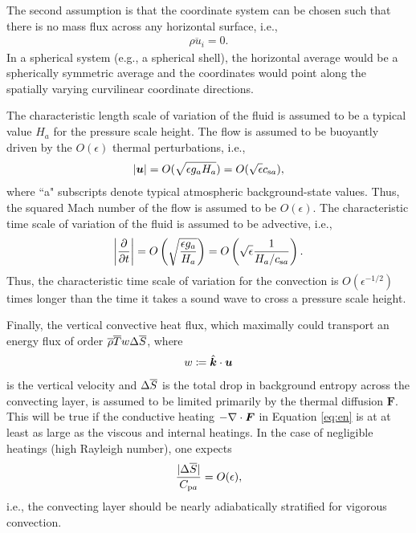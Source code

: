 \documentclass[12pt]{article}
\newcommand{\vecf}{\bm{F}}
\newcommand{\veck}{\hat{\bm{k}}}
\newcommand{\csa}{c_{{\rm s}a}}
\newcommand{\cpa}{C_{{\rm p}a}}
\begin{document}
	The second assumption is that the coordinate system can be chosen such that there is no mass flux across any horizontal surface, i.e.,
	\begin{align}\label{eq:nomassflux}
		\overline{\rho u_i}=0.
	\end{align}
	In a spherical system (e.g., a spherical shell), the horizontal average would be a spherically symmetric average and the coordinates would point along the spatially varying curvilinear coordinate directions. 
	
	The characteristic length scale of variation of the fluid is assumed to be a typical value $H_a$ for the pressure scale height. The flow is assumed to be buoyantly driven by the $O(\epsilon)$ thermal perturbations, i.e., 
	\begin{align}\label{eq:scaleu}
		|\vecu| = O(\sqrt{\epsilon g_a H_a}) = O(\sqrt{\epsilon}\csa),
	\end{align}
	where ``a" subscripts denote typical atmospheric background-state values. Thus, the squared Mach number of the flow is assumed to be $O(\epsilon)$. The characteristic time scale of variation of the fluid is assumed to be advective, i.e., 
	\begin{align}\label{eq:scaleu}
	\left|\pderiv{}{t}\right|  = O\left(\sqrt{\frac{\epsilon g_a}{H_a}}\right) = O\left(\sqrt{\epsilon} \frac{1}{H_a/\csa}\right).
	\end{align}
	Thus, the characteristic time scale of variation for the convection is $O(\epsilon^{-1/2})$ times longer than the time it takes a sound wave to cross a pressure scale height. 
	
	Finally, the vertical convective heat flux, which maximally could transport an energy flux of order $\overline{\rho} \overline{T} w \Delta\overline{S}$, where 
	\begin{align}\label{eq:defw}
		w\define\veck\cdot\vecu
	\end{align} is the vertical velocity and $\Delta \overline{S} $ is the total drop in background entropy across the convecting layer, is assumed to be limited primarily by the thermal diffusion $\vecf$. This will be true if the conductive heating $-\Div \vecf$ in Equation \eqref{eq:en} is at at least as large as the viscous and internal heatings. In the case of negligible heatings (high Rayleigh number), one expects
	\begin{align}
		\frac{|\Delta\entrover|}{\cpa} = O(\epsilon),
	\end{align}
	i.e., the convecting layer should be nearly adiabatically stratified for vigorous convection. 
	
\end{document}
